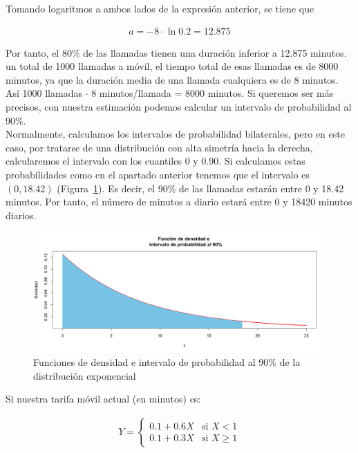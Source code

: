 \documentclass[12pt,a4paper,twoside,openright,titlepage,final]{article}
\begin{document}
Tomando logaritmos a ambos lados de la expresión anterior, se tiene que 

\begin{align*}
a = -8 \cdot \ln 0.2 = 12.875
\end{align*}

Por tanto, el 80\% de las llamadas tienen una duración inferior a 12.875 minutos.\\

un total de 1000 llamadas a móvil, el tiempo total de esas llamadas es de 8000 minutos, ya que la duración media de una llamada cualquiera es de 8 minutos. Así 1000 llamadas $\cdot$ 8 minutos/llamada = 8000 minutos. Si queremos ser más precisos, con nuestra estimación podemos calcular un intervalo de probabilidad al 90\%.\\

Normalmente, calculamos los intervalos de probabilidad bilaterales, pero en este caso, por tratarse de una distribución con alta simetría hacia la derecha, calcularemos el intervalo con los cuantiles 0 y 0.90. Si calculamos estas probabilidades como en el apartado anterior tenemos que el intervalo es $(0, 18.42)$ (Figura~\ref{fig:intervalo_probabilidad_exponencial}). Es decir, el 90\% de las llamadas estarán entre 0 y 18.42 minutos. Por tanto, el número de minutos a diario estará entre 0 y 18420 minutos diarios.\\

\begin{figure}[tbph!]
\centering
\includegraphics[width=0.9\linewidth]{imagenes/intervalo_probabilidad_exponencial}
\caption{Funciones de densidad e intervalo de probabilidad al 90\% de la distribución exponencial}
\label{fig:intervalo_probabilidad_exponencial}
\end{figure}

Si nuestra tarifa móvil actual (en minutos) es:

\begin{align*}
Y = \begin{cases}
0.1 + 0.6X & \text{si } X < 1 \\
0.1 + 0.3X & \text{si } X \geq 1
\end{cases}
\end{align*}
\end{document}
